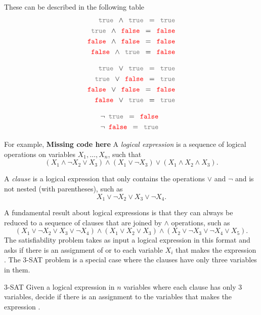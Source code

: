 \documentclass[../open-optimization/open-optimization.tex]{subfiles}
\begin{document}
These can be described in the following table
\begin{align}
\true \land \true = \true\\
\true \land \false = \false\\
\false \land \false = \false\\
\false \land \true = \false
\end{align}

\begin{align}
\true \lor \true = \true\\
\true \lor \false = \true\\
\false \lor \false = \false\\
\false \lor \true = \true
\end{align}

\begin{align}
\neg \true = \false\\
\neg \false = \true
\end{align}

For example, \textbf{Missing code here}
A \emph{logical expression} is a sequence of logical operations on variables $X_1, \dots, X_n$, such that 
\begin{equation}
(X_1 \land \neg X_2 \lor X_3) \land (X_1 \lor \neg X_3) \lor (X_1 \land X_2 \land X_3).
\end{equation}

A \emph{clause} is a logical expression that only contains the operations $\lor$ and $\neg$ and is not nested (with parentheses), such as 
\begin{equation}
X_1 \lor \neg X_2 \lor X_3 \lor \neg X_4.
\end{equation}

A fundamental result about logical expressions is that they can always be reduced to a sequence of clauses that are joined by $\land$ operations, such as 
\begin{equation}
(X_1 \lor \neg X_2 \lor X_3 \lor \neg X_4) \land (X_1 \lor X_2 \lor X_3) \land (X_2 \lor \neg X_3 \lor \neg X_4 \lor X_5).
\end{equation}
The satisfiability problem takes as input a logical expression in this format and asks if there is an assignment of \true  or \false to each variable $X_i$ that makes the expression \true.  The 3-SAT problem is a special case where the clauses have only three variables in them.
 
\begin{general}{3-SAT}{\npcomplete}
Given a logical expression in $n$ variables where each clause has only 3 variables, decide if there is an assignment to the variables that makes the expression \true.
\end{general}
\end{document}
